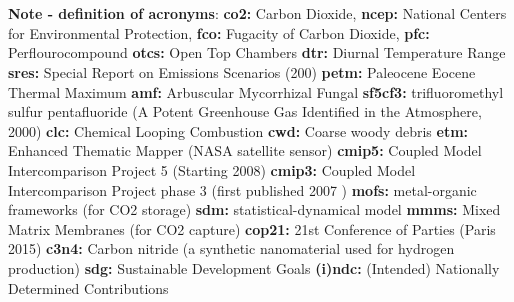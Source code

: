 \documentclass{article}
\begin{document}
\begin{linenumbers}
		\section*{}
		\textbf{Note - definition of acronyms}: 		\textbf{co2:} Carbon Dioxide, 	
		\textbf{ncep:} National Centers for Environmental Protection,
		\textbf{fco:} Fugacity of Carbon Dioxide,
		\textbf{pfc:} Perflourocompound
		\textbf{otcs:} Open Top Chambers
		\textbf{dtr:} Diurnal Temperature Range
		\textbf{sres:} Special Report on Emissions Scenarios (200)
		\textbf{petm:} Paleocene Eocene Thermal Maximum
		\textbf{amf:}  Arbuscular Mycorrhizal Fungal
		\textbf{sf5cf3:} trifluoromethyl sulfur pentafluoride (A Potent Greenhouse Gas Identified in the Atmosphere, 2000)
		\textbf{clc:} Chemical Looping Combustion
		\textbf{cwd:} Coarse woody debris
		\textbf{etm:} Enhanced Thematic Mapper (NASA satellite sensor)
		\textbf{cmip5:} Coupled Model Intercomparison Project 5 (Starting 2008)
		\textbf{cmip3:} Coupled Model Intercomparison Project phase 3 (first published 2007 \cite{Meehl2007})
		\textbf{mofs:} metal-organic frameworks (for CO2 storage)
		\textbf{sdm:} statistical-dynamical model
		\textbf{mmms:} Mixed Matrix Membranes (for CO2 capture)
		\textbf{cop21:} 21st Conference of Parties (Paris 2015) 
		\textbf{c3n4:} Carbon nitride (a synthetic nanomaterial used for hydrogen production)
		\textbf{sdg:} Sustainable Development Goals
		\textbf{(i)ndc:} (Intended) Nationally Determined Contributions	
		
		\section*{}	


\end{linenumbers}
\end{document}
